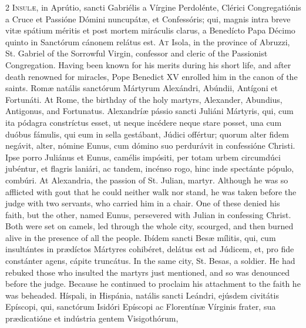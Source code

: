 \begin{paracol}{2}
\lettrine[lines=2]{I}{nsulæ,} in Aprútio, sancti Gabriélis a Vírgine 
 Perdolénte, Clérici Congregatiónis a Cruce et Passióne Dómini nuncupátæ, et 
 Confessóris; qui, magnis intra breve vitæ spátium méritis et post mortem 
 miráculis clarus, a Benedícto Papa Décimo quinto in Sanctórum cánonem 
 relátus est.
\switchcolumn
{}
\lettrine[lines=2]{A}{t} Isola, in the province of Abruzzi, St. Gabriel of the Sorrowful Virgin, 
 confessor and cleric of the Passionist Congregation. Having been known 
 for his merits during his short life, and after death renowned for miracles, 
 Pope Benedict XV enrolled him in the canon of the saints.
\switchcolumn*
{}
Romæ natális sanctórum Mártyrum Alexándri, 
 Abúndii, Antígoni et Fortunáti.
\switchcolumn
{}
At Rome, the birthday of the holy martyrs, Alexander, Abundius, Antigonus, 
 and Fortunatus.
\switchcolumn*
{}
Alexandríæ pássio sancti Juliáni Mártyris, qui, 
 cum ita pódagra constríctus esset, ut neque incédere neque stare posset, una 
 cum duóbus fámulis, qui eum in sella gestábant, Júdici offértur; quorum 
 alter fidem negávit, alter, nómine Eunus, cum dómino suo perdurávit in 
 confessióne Christi. Ipse porro Juliánus et Eunus, camélis impósiti, 
 per totam urbem circumdúci jubéntur, et flagris laniári, ac tandem, incénso 
 rogo, hinc inde spectánte pópulo, combúri.
\switchcolumn
{}
At Alexandria, the passion of St. Julian, martyr. Although he was so 
 afflicted with gout that he could neither walk nor stand, he was taken 
 before the judge with two servants, who carried him in a chair. One of 
 these denied his faith, but the other, named Eunus, persevered with Julian 
 in confessing Christ. Both were set on camels, led through the whole 
 city, scourged, and then burned alive in the presence of all the people.
\switchcolumn*
{}
Ibídem sancti Besæ mílitis, qui, cum 
 insultántes in prædíctos Mártyres cohibéret, delátus est ad Júdicem, et, pro 
 fide constánter agens, cápite truncátus.
\switchcolumn
{}
In the same city, St. Besas, a soldier. He had rebuked those who 
 insulted the martyrs just mentioned, and so was denounced before the judge. 
 Because he continued to proclaim his attachment to the faith he was 
 beheaded.
\switchcolumn*
{}
Híspali, in Hispánia, natális sancti Leándri, 
 ejúsdem civitátis Epíscopi, qui, sanctórum Isidóri Epíscopi ac Florentínæ 
 Vírginis frater, sua prædicatióne et indústria gentem Visigothórum, 

\end{paracol}
